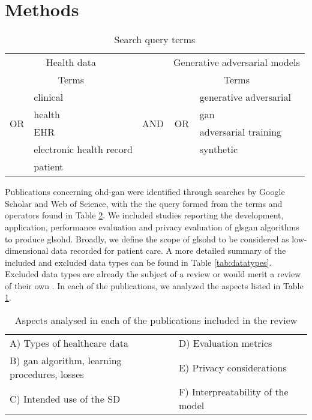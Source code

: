 \section{Methods}


\begin{table}[htpb]
  \center
    \begin{tabular}{@{}clccl@{}} \toprule
	    \multicolumn{2}{c}{Health data} & & \multicolumn{2}{c}{Generative adversarial models} \\ \cmidrule{1-2} \cmidrule{4-5}
	    \multicolumn{2}{c}{Terms} & {} & \multicolumn{2}{c}{Terms} \\ \cmidrule{2-2} \cmidrule{5-5}
	    \multirow{4}{*}{OR} & clinical & \multirow[t]{4}{*}{\quad AND\quad} & \multirow{4}{*}{OR} & generative adversarial\\
	    {} & health & {} & {} & \gls{gan} \\ 
	    {} & EHR & {} & {} & adversarial training \\
	    {} & electronic health record & {} & {} & synthetic  \\
	    {} & patient & {} & {} & {} \\
	    \bottomrule
    \end{tabular}
    \caption{{Search query terms}}\label{tab:search}
\end{table}

Publications concerning \gls{ohd-gan} were identified through searches by Google Scholar and Web of Science, with the the query formed from the terms and operators found in Table \ref{tab:themes}. We included studies reporting the development, application, performance evaluation and privacy evaluation of gls{gan} algorithms to produce gls{ohd}. Broadly, we define the scope of gls{ohd} to be considered as low-dimensional data recorded for patient care. A more detailed summary of the included and excluded data types can be found in Table \ref{tab:datatypes}. Excluded data types are already the subject of a review or would merit a review of their own \cite{Yi_2019}\cite{Nakata2019}\cite{Anwar_2018}. In each of the publications, we analyzed the aspects listed in Table \ref{tab:search}.\par

\begin{table}[htbp]
\centering
  \caption{Aspects analysed in each of the publications included in the review\label{tab:themes}}
  \begin{tabular}{ll}\toprule
  A) Types of healthcare data & D) Evaluation metrics\\
  B) \gls{gan} algorithm, learning procedures, losses & E) Privacy considerations\\
  C) Intended use of the SD & F) Interpreatability of the model\\\bottomrule
  \end{tabular}
\end{table}


